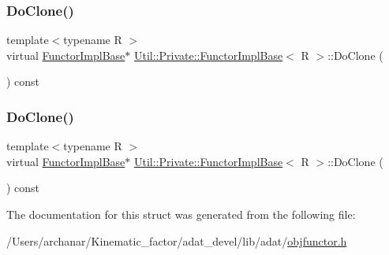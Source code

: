 \subsubsection{\texorpdfstring{DoClone()}{DoClone()}\hspace{0.1cm}{\footnotesize\ttfamily [1/2]}}
{\footnotesize\ttfamily template$<$typename R $>$ \\
virtual \mbox{\hyperlink{structUtil_1_1Private_1_1FunctorImplBase}{Functor\+Impl\+Base}}$\ast$ \mbox{\hyperlink{structUtil_1_1Private_1_1FunctorImplBase}{Util\+::\+Private\+::\+Functor\+Impl\+Base}}$<$ R $>$\+::Do\+Clone (\begin{DoxyParamCaption}{ }\end{DoxyParamCaption}) const\hspace{0.3cm}{\ttfamily [pure virtual]}}

\mbox{\label{structUtil_1_1Private_1_1FunctorImplBase_a3e0e91d434c55173ed546839b53721c5}} 
\subsubsection{\texorpdfstring{DoClone()}{DoClone()}\hspace{0.1cm}{\footnotesize\ttfamily [2/2]}}
{\footnotesize\ttfamily template$<$typename R $>$ \\
virtual \mbox{\hyperlink{structUtil_1_1Private_1_1FunctorImplBase}{Functor\+Impl\+Base}}$\ast$ \mbox{\hyperlink{structUtil_1_1Private_1_1FunctorImplBase}{Util\+::\+Private\+::\+Functor\+Impl\+Base}}$<$ R $>$\+::Do\+Clone (\begin{DoxyParamCaption}{ }\end{DoxyParamCaption}) const\hspace{0.3cm}{\ttfamily [pure virtual]}}



The documentation for this struct was generated from the following file\+:\begin{DoxyCompactItemize}
\item 
/\+Users/archanar/\+Kinematic\+\_\+factor/adat\+\_\+devel/lib/adat/\mbox{\hyperlink{lib_2adat_2objfunctor_8h}{objfunctor.\+h}}\end{DoxyCompactItemize}
